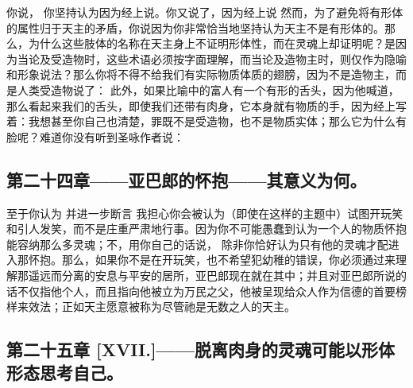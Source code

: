 你说， 你坚持认为因为经上说。你又说了，因为经上说 然而，为了避免将有形体的属性归于天主的矛盾，你说因为你非常恰当地坚持认为天主不是有形体的。那么，为什么这些肢体的名称在天主身上不证明形体性，而在灵魂上却证明呢？是因为当论及受造物时，这些术语必须按字面理解，而当论及造物主时，则仅作为隐喻和形象说法？那么你将不得不给我们有实际物质体质的翅膀，因为不是造物主，而是人类受造物说了： 此外，如果比喻中的富人有一个有形的舌头，因为他喊道，那么看起来我们的舌头，即使我们还带有肉身，它本身就有物质的手，因为经上写着：我想甚至你自己也清楚，罪既不是受造物，也不是物质实体；那么它为什么有脸呢？难道你没有听到圣咏作者说：\par


\subsection{第二十四章——亚巴郎的怀抱——其意义为何。}

至于你认为 并进一步断言 我担心你会被认为（即使在这样的主题中）试图开玩笑和引人发笑，而不是庄重严肃地行事。因为你不可能愚蠢到认为一个人的物质怀抱能容纳那么多灵魂；不，用你自己的话说， 除非你恰好认为只有他的灵魂才配进入那怀抱。那么，如果你不是在开玩笑，也不希望犯幼稚的错误，你必须通过来理解那遥远而分离的安息与平安的居所，亚巴郎现在就在其中；并且对亚巴郎所说的话不仅指他个人，而且指向他被立为万民之父，他被呈现给众人作为信德的首要榜样来效法；正如天主愿意被称为尽管祂是无数之人的天主。\par


\subsection{第二十五章 [XVII.]——脱离肉身的灵魂可能以形体形态思考自己。}

